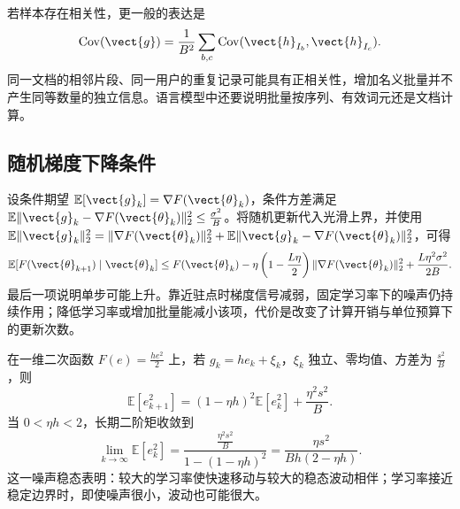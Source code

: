 \documentclass[../textbook.tex]{subfiles}
\begin{document}
若样本存在相关性，更一般的表达是
\begin{equation}
 \operatorname{Cov}(\vect{g})=\frac1{B^2}\sum_{b,c}\operatorname{Cov}(\vect{h}_{I_b},\vect{h}_{I_c}).
\end{equation}
同一文档的相邻片段、同一用户的重复记录可能具有正相关性，增加名义批量并不产生同等数量的独立信息。语言模型中还要说明批量按序列、有效词元还是文档计算。

\subsection{随机梯度下降条件}
设条件期望 $\mathbb E[\vect{g}_k]=\nabla F(\vect{\theta}_k)$，条件方差满足 $\mathbb E\|\vect{g}_k-\nabla F(\vect{\theta}_k)\|_2^2\leq\frac{\sigma^2}{B}$。将随机更新代入光滑上界，并使用
$\mathbb E\|\vect{g}_k\|_2^2=\|\nabla F(\vect{\theta}_k)\|_2^2+\mathbb E\|\vect{g}_k-\nabla F(\vect{\theta}_k)\|_2^2$，可得
\begin{equation}
 \mathbb E[F(\vect{\theta}_{k+1})\mid\vect{\theta}_k]
 \leq F(\vect{\theta}_k)-\eta\left(1-\frac{L\eta}2\right)\|\nabla F(\vect{\theta}_k)\|_2^2
 +\frac{L\eta^2\sigma^2}{2B}.\label{eq:opt-noisy-descent}
\end{equation}
最后一项说明单步可能上升。靠近驻点时梯度信号减弱，固定学习率下的噪声仍持续作用；降低学习率或增加批量能减小该项，代价是改变了计算开销与单位预算下的更新次数。

在一维二次函数 $F(e)=\frac{he^2}{2}$ 上，若 $g_k=he_k+\xi_k$，$\xi_k$ 独立、零均值、方差为 $\frac{s^2}{B}$，则
\begin{equation}
 \mathbb E[e_{k+1}^2]=(1-\eta h)^2\mathbb E[e_k^2]+\frac{\eta^2s^2}{B}.
\end{equation}
当 $0<\eta h<2$，长期二阶矩收敛到
\begin{equation}
 \lim_{k\to\infty}\mathbb E[e_k^2]
 =\frac{\frac{\eta^2s^2}{B}}{1-(1-\eta h)^2}
 =\frac{\eta s^2}{Bh(2-\eta h)}.\label{eq:opt-noise-floor}
\end{equation}
这一噪声稳态表明：较大的学习率使快速移动与较大的稳态波动相伴；学习率接近稳定边界时，即使噪声很小，波动也可能很大。
\end{document}
